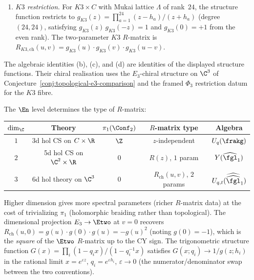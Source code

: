 \begin{conjecture}
\begin{enumerate}[label=\textup{(\alph*)}]
 \item \emph{$K3$ restriction.} For $K3 \times C$ with Mukai lattice $\Lambda$ of rank~$24$, the structure function restricts to $g_{K3}(z) = \prod_{a=1}^{24} (z - h_a)/(z + h_a)$ (degree $(24,24)$, satisfying $g_{K3}(z)\,g_{K3}(-z) = 1$ and $g_{K3}(0) = +1$ from the even rank). The two-parameter $K3$ $R$-matrix is $R_{K3,\mathrm{ch}}(u,v) = g_{K3}(u) \cdot g_{K3}(v) \cdot g_{K3}(u-v)$.
\end{enumerate}
The algebraic identities \textup{(b)}, \textup{(c)}, and \textup{(d)}
are identities of the displayed structure functions. Their chiral
realisation uses the $E_3$-chiral structure on $\C^3$ of
Conjecture~\ref{conj:topological-e3-comparison} and the framed
$\Phi_3$ restriction datum for the $K3$ fibre.
\end{conjecture}

\begin{remark}
\label{rem:dimensional-hierarchy-holonomy}
The $\En$ level determines the type of $R$-matrix:
\begin{center}
\begin{tabular}{ccccc}
 \toprule
 $\dim_{\C}$ & Theory & $\pi_1(\Conf_2)$ & $R$-matrix type & Algebra \\
 \midrule
 $1$ & 3d hol CS on $C \times \R$ & $\Z$ & $z$-independent & $U_q(\frakg)$ \\
 $2$ & 5d hol CS on $\C^2 \times \R$ & $0$ & $R(z)$, $1$ param & $Y(\widehat{\fgl}_1)$ \\
 $3$ & 6d hol theory on $\C^3$ & $0$ & $R_{\mathrm{ch}}(u,v)$, $2$ params & $U_{q,t}(\widehat{\widehat{\fgl}}_1)$ \\
 \bottomrule
\end{tabular}
\end{center}
Higher dimension gives more spectral parameters (richer $R$-matrix data) at the cost of trivializing $\pi_1$ (holomorphic braiding rather than topological). The dimensional projection $E_3 \to \Etwo$ at $v = 0$ recovers $R_{\mathrm{ch}}(u, 0) = g(u) \cdot g(0) \cdot g(u) = -g(u)^2$ (noting $g(0) = -1$), which is the \emph{square} of the $\Etwo$ $R$-matrix up to the CY sign. The trigonometric structure function $G(x) = \prod_i (1 - q_i x)/(1 - q_i^{-1} x)$ satisfies $G(x; q_i) \to 1/g(z; h_i)$ in the rational limit $x = e^{\varepsilon z}$, $q_i = e^{\varepsilon h_i}$, $\varepsilon \to 0$ (the numerator/denominator swap between the two conventions).
\end{remark}

